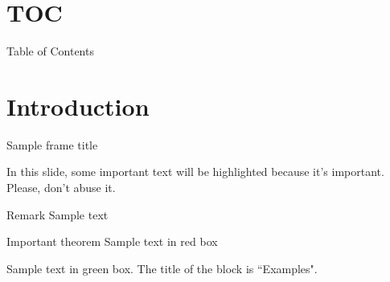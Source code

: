 \documentclass[
xcolor={svgnames},
hyperref={pagebackref,bookmarks},
aspectratio=43,
]{beamer}
\title{\presentationtitle}
\subtitle{\presentationsubtitle}
\author{\presenter}
\institute[UTD]{
    \school\\
    \university\\
    {\color{DarkBlue} \faIcon{envelope-open-text} \email}\\
    {\color{DarkBlue} \faIcon{globe} \personalwebsite}
    }
\date{\today}
\begin{document}
\maketitle

\section{TOC}
\begin{frame}{Table of Contents}
\tableofcontents
\end{frame}

\section{Introduction}
\begin{frame}{Sample frame title}

In this slide, some important text will be
\alert{highlighted} because it's important.
Please, don't abuse it.

\begin{block}{Remark}
Sample text
\end{block}

\begin{alertblock}{Important theorem}
Sample text in red box
\end{alertblock}

\begin{examples}
Sample text in green box. The title of the block is ``Examples".
\end{examples}

\end{frame}
\end{document}
